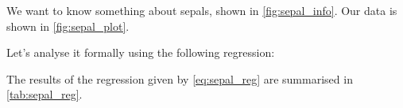 \documentclass[a4paper,twocolumn]{article}
\begin{document}
We want to know something about sepals, shown in \cref{fig:sepal_info}. Our data is shown in \cref{fig:sepal_plot}.



Let’s analyse it formally using the following regression:


The results of the regression given by \cref{eq:sepal_reg} are summarised in \cref{tab:sepal_reg}.

\end{document}
